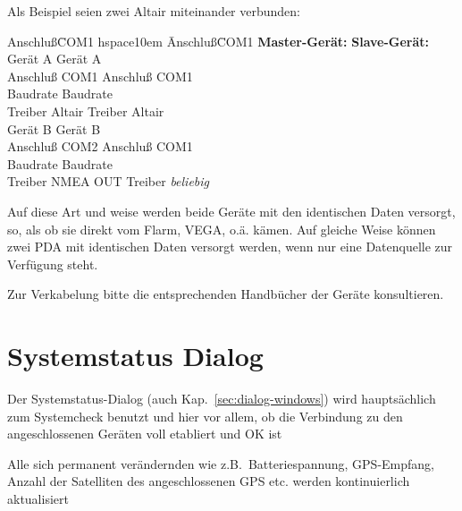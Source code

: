 Als Beispiel seien zwei \textsf{Altair} miteinander verbunden:
\begin{center}
\begin{tabbing}
Anschluß\quad\=  COM1  hspace{10em}   \=  Anschluß\quad\=  COM1\kill
\textbf{Master-Gerät:}   \>     \> \textbf{Slave-Gerät:}\\[0.5em]
\textsf{Gerät A}         \>     \> \textsf{Gerät A}\\
Anschluß\quad\>  COM1    \>           Anschluß\quad\>  COM1\\
Baudrate         \>           Baudrate\\
Treiber\> \textsf{Altair}\>           Treiber\> \textsf{Altair}\\[0.75em]
%
\textsf{Gerät B}         \>      \>  \textsf{Gerät B}\\
Anschluß\>  COM2         \>           Anschluß\>  COM1\\
Baudrate         \>           Baudrate\\
Treiber\> NMEA OUT       \>           Treiber\> \textsl{beliebig}\\[0.75em]
\end{tabbing}
\end{center}


Auf diese Art und weise werden beide Geräte mit den identischen Daten versorgt, so, als ob sie direkt vom Flarm, VEGA, o.ä. kämen. Auf gleiche Weise können zwei \textsf{PDA} mit identischen Daten versorgt werden, wenn nur eine Datenquelle zur Verfügung steht.

Zur Verkabelung bitte die entsprechenden Handbücher der Geräte konsultieren.

\section{Systemstatus Dialog}\label{sec:system-status-dialog} 

Der Systemstatus-Dialog (auch Kap.~\ref{sec:dialog-windows}) wird hauptsächlich zum Systemcheck benutzt und hier vor allem, ob die Verbindung zu den angeschlossenen Geräten voll etabliert und OK ist

Alle sich permanent verändernden wie z.B.\ Batteriespannung, GPS-Empfang, Anzahl der Satelliten des angeschlossenen GPS etc. werden kontinuierlich aktualisiert
